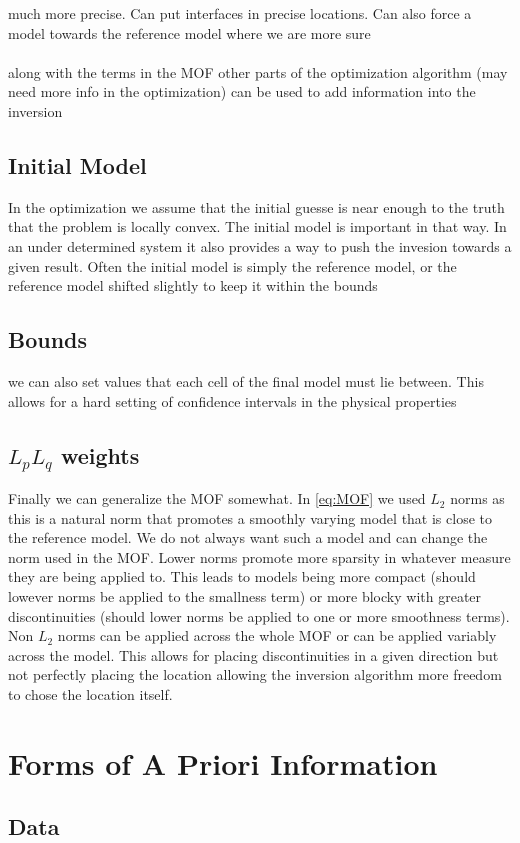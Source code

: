 much more precise. Can put interfaces in precise locations. Can also force a model towards the reference model where we are more sure
\\\\
along with the terms in the \ac{MOF} other parts of the optimization algorithm (may need more info in the optimization) can be used to add information into the inversion

\subsection{Initial Model}
\label{sec:Initial Model}

In the optimization we assume that the initial guesse is near enough to the truth that the problem is locally convex. The initial model is important in that way. In an under determined system it also provides a way to push the invesion towards a given result. Often the initial model is simply the reference model, or the reference model shifted slightly to keep it within the bounds

\subsection{Bounds}
\label{sec:Bounds}

we can also set values that each cell of the final model must lie between. This allows for a hard setting of confidence intervals in the physical properties

\subsection{$L_p L_q$ weights}
\label{sec:Lp Lq weights}

Finally we can generalize the \ac{MOF} somewhat. In \autoref{eq:MOF} we used $L_2$ norms as this is a natural norm that promotes a smoothly varying model that is close to the reference model. We do not always want such a model and can change the norm used in the \ac{MOF}. Lower norms promote more sparsity in whatever measure they are being applied to. This leads to models being more compact (should lowever norms be applied to the smallness term) or more blocky with greater discontinuities (should lower norms be applied to one or more smoothness terms). Non $L_2$ norms can be applied across the whole \ac{MOF} or can be applied variably across the model. This allows for placing discontinuities in a given direction but not perfectly placing the location allowing the inversion algorithm more freedom to chose the location itself.

\section{Forms of A Priori Information}
\label{sec:Forms of A Priori Information}

\subsection{Data}
\label{sec:A priori data}




\endinput

Any text after an \endinput is ignored.
You could put scraps here or things in progress.
